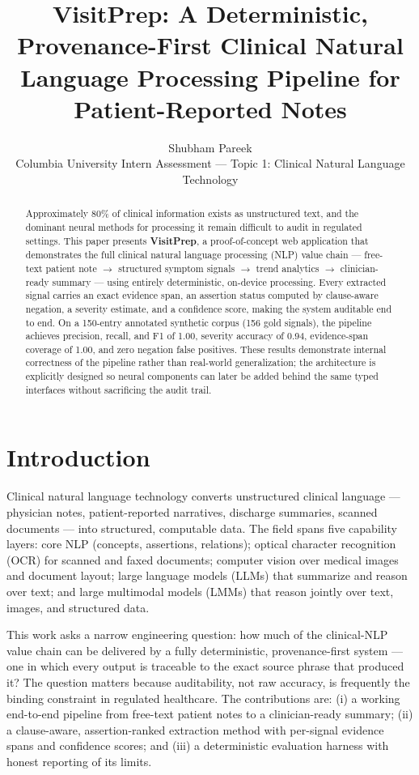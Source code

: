 \documentclass[10pt,twocolumn]{article}
\title{\vspace{-1.2em}\textbf{VisitPrep: A Deterministic, Provenance-First Clinical Natural\\Language Processing Pipeline for Patient-Reported Notes}\vspace{-0.4em}}
\author{Shubham Pareek\\
\small Columbia University \quad\textbar\quad Intern Assessment --- Topic 1: Clinical Natural Language Technology\vspace{-1.6em}}
\date{}
\begin{document}
\maketitle

\begin{abstract}
\noindent Approximately 80\% of clinical information exists as unstructured text, and the dominant neural methods for processing it remain difficult to audit in regulated settings. This paper presents \textbf{VisitPrep}, a proof-of-concept web application that demonstrates the full clinical natural language processing (NLP) value chain --- free-text patient note $\rightarrow$ structured symptom signals $\rightarrow$ trend analytics $\rightarrow$ clinician-ready summary --- using entirely deterministic, on-device processing. Every extracted signal carries an exact evidence span, an assertion status computed by clause-aware negation, a severity estimate, and a confidence score, making the system auditable end to end. On a 150-entry annotated synthetic corpus (156 gold signals), the pipeline achieves precision, recall, and F1 of 1.00, severity accuracy of 0.94, evidence-span coverage of 1.00, and zero negation false positives. These results demonstrate internal correctness of the pipeline rather than real-world generalization; the architecture is explicitly designed so neural components can later be added behind the same typed interfaces without sacrificing the audit trail.
\end{abstract}

\section{Introduction}
Clinical natural language technology converts unstructured clinical language --- physician notes, patient-reported narratives, discharge summaries, scanned documents --- into structured, computable data. The field spans five capability layers: core NLP (concepts, assertions, relations); optical character recognition (OCR) for scanned and faxed documents; computer vision over medical images and document layout; large language models (LLMs) that summarize and reason over text; and large multimodal models (LMMs) that reason jointly over text, images, and structured data.

This work asks a narrow engineering question: how much of the clinical-NLP value chain can be delivered by a fully deterministic, provenance-first system --- one in which every output is traceable to the exact source phrase that produced it? The question matters because auditability, not raw accuracy, is frequently the binding constraint in regulated healthcare. The contributions are: (i) a working end-to-end pipeline from free-text patient notes to a clinician-ready summary; (ii) a clause-aware, assertion-ranked extraction method with per-signal evidence spans and confidence scores; and (iii) a deterministic evaluation harness with honest reporting of its limits.
\end{document}
